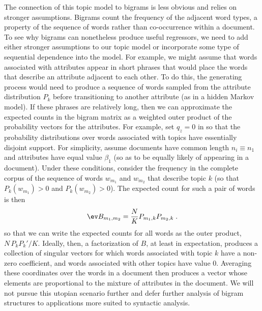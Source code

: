 \documentclass[12pt]{article}
\begin{document}
The connection of this topic model to bigrams is less obvious and relies on stronger assumptions.  Bigrams count the frequency of the adjacent word types, a property of the sequence of words rather than co-occurrence within a document.  To see why bigrams can nonetheless produce useful regressors, we need to add either stronger assumptions to our topic model or incorporate some type of sequential dependence into the model.  For example, we might assume that words associated with attributes appear in short phrases that would place the words that describe an attribute adjacent to each other.   To do this, the generating process would need to produce a sequence of words sampled from the attribute distribution $P_k$ before transitioning to another attribute (as in a hidden Markov model).  If these phrases are relatively long, then we can approximate the expected counts in the bigram matrix as a weighted outer product of the probability vectors for the attributes.  For example, set $q_z = 0$ in  so that the probability distributions over words associated with topics have essentially disjoint support.  For simplicity, assume documents have common length $n_i \equiv n_1$ and attributes have equal value $\beta_1$ (so as to be equally likely of appearing in a document). Under these conditions, consider the frequency in the complete corpus of the sequence of words $w_{m_1}$ and $w_{m_2}$ that describe topic $k$ (so that $P_k(w_{m_1}) > 0$ and $P_k(w_{m_2}) > 0$).  The expected count for such a pair of words is then
 \begin{equation}
  \ev B_{m_1,m_2} = \frac{N}{K} P_{m_1,k} P_{m_2,k}  \;.
  \label{eq:Pwm}
\end{equation}
so that we can  write the expected counts for all words as the outer product, $N\,P_k P_k'/K$.  Ideally, then, a factorization of $B$, at least in expectation, produces a collection of singular vectors for which words associated with topic $k$ have a non-zero coefficient, and words associated with other topics have value 0. Averaging these coordinates over the words in a document then produces a vector whose elements are proportional to the mixture of attributes in the document.  We will not pursue this utopian scenario further and defer further analysis of bigram structures to applications more suited to syntactic analysis.






\end{document}
